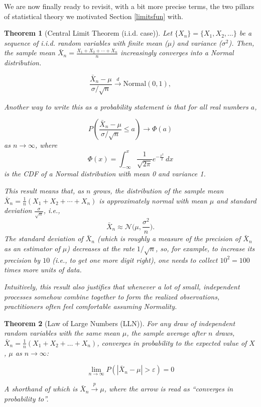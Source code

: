 \documentclass[
]{book}
\newtheorem{theorem}{Theorem}[chapter]
\theoremstyle{definition}
\theoremstyle{definition}
\theoremstyle{definition}
\theoremstyle{definition}
\theoremstyle{remark}
\begin{document}
We are now finally ready to revisit, with a bit more precise terms, the two pillars of statistical theory we motivated Section \ref{limitsfun} with.

\begin{theorem}[Central Limit Theorem (i.i.d. case)]
\protect\hypertarget{thm:clt}{}{\label{thm:clt} {} }Let \(\{X_n\} = \{X_1, X_2, \ldots\}\) be a sequence of i.i.d. random variables with finite mean (\(\mu\)) and variance (\(\sigma^2\)). Then, the sample mean \(\bar{X}_n = \frac{X_1 + X_2 + \cdots + X_n}{n}\) increasingly converges into a Normal distribution.

\[\frac{\bar{X}_n - \mu}{\sigma / \sqrt{n}} \xrightarrow{d} \text{Normal}(0, 1),\]

Another way to write this as a probability statement is that for all real numbers \(a\),

\[P\left(\frac{\bar{X}_n - \mu}{\sigma/\sqrt{n}} \le a\right) \rightarrow \Phi(a)\]
as \(n\to \infty\), where \[\Phi(x) = \int_{-\infty}^x \frac{1}{\sqrt{2\pi}}e^{-\frac{x^2}{2}} \, dx\] is the CDF of a Normal distribution with mean 0 and variance 1.

This result means that, as \(n\) grows, the distribution of the sample mean \(\bar X_n = \frac{1}{n} (X_1 + X_2 + \cdots + X_n)\) is approximately normal with mean \(\mu\) and standard deviation \(\frac{\sigma}{\sqrt n}\), i.e.,
\[\bar{X}_n \approx \mathcal{N}\bigg(\mu, \frac{\sigma^2}{n}\bigg).\] The standard deviation of \(\bar X_n\) (which is roughly a measure of the precision of \(\bar X_n\) as an estimator of \(\mu\)) decreases at the rate \(1/\sqrt{n}\), so, for example, to increase its precision by \(10\) (i.e., to get one more digit right), one needs to collect \(10^2=100\) times more units of data.

Intuitively, this result also justifies that whenever a lot of small, independent processes somehow combine together to form the realized observations, practitioners often feel comfortable assuming Normality.
\end{theorem}
\begin{theorem}[Law of Large Numbers (LLN)]
\protect\hypertarget{thm:lln}{}{\label{thm:lln} {} }For any draw of independent random variables with the same mean \(\mu\), the sample average after \(n\) draws, \(\bar{X}_n = \frac{1}{n}(X_1 + X_2 + \ldots + X_n)\), converges in probability to the expected value of \(X\), \(\mu\) as \(n \rightarrow \infty\):

\[\lim\limits_{n\to \infty} P(|\bar{X}_n - \mu | > \varepsilon) = 0\]

A shorthand of which is \(\bar{X}_n \xrightarrow{p} \mu\), where the arrow is read as ``converges in probability to''.
\end{theorem}
\end{document}

